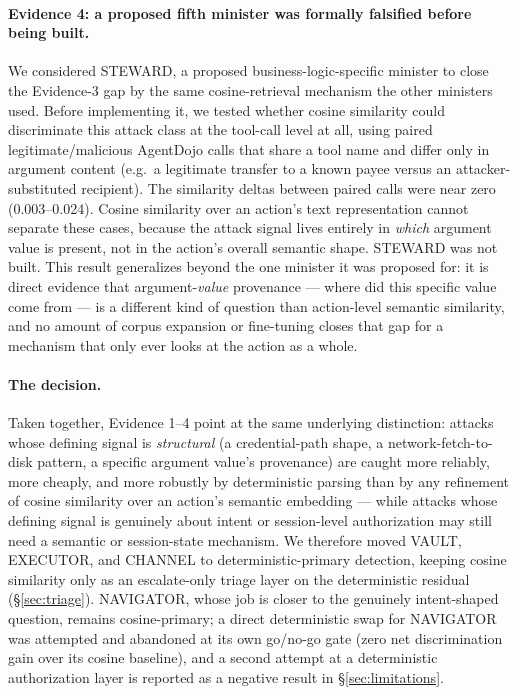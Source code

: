 \documentclass[sigconf,anonymous,review]{acmart}
\begin{document}
\paragraph{Evidence 4: a proposed fifth minister was formally falsified before
being built.} We considered STEWARD, a proposed business-logic-specific
minister to close the Evidence-3 gap by the same cosine-retrieval mechanism
the other ministers used. Before implementing it, we tested whether cosine
similarity could discriminate this attack class at the tool-call level at
all, using paired legitimate/malicious AgentDojo calls that share a tool name
and differ only in argument content (e.g.\ a legitimate transfer to a known
payee versus an attacker-substituted recipient). The similarity deltas
between paired calls were near zero (0.003--0.024). Cosine similarity over an
action's text representation cannot separate these cases, because the
attack signal lives entirely in \emph{which} argument value is present, not
in the action's overall semantic shape. STEWARD was not built. This result
generalizes beyond the one minister it was proposed for: it is direct
evidence that argument-\emph{value} provenance --- where did this specific
value come from --- is a different kind of question than action-level
semantic similarity, and no amount of corpus expansion or fine-tuning closes
that gap for a mechanism that only ever looks at the action as a whole.

\paragraph{The decision.} Taken together, Evidence 1--4 point at the same
underlying distinction: attacks whose defining signal is \emph{structural}
(a credential-path shape, a network-fetch-to-disk pattern, a specific
argument value's provenance) are caught more reliably, more cheaply, and more
robustly by deterministic parsing than by any refinement of cosine
similarity over an action's semantic embedding --- while attacks whose
defining signal is genuinely about intent or session-level authorization may
still need a semantic or session-state mechanism. We therefore moved VAULT,
EXECUTOR, and CHANNEL to deterministic-primary detection, keeping cosine
similarity only as an escalate-only triage layer on the deterministic
residual (\S\ref{sec:triage}). NAVIGATOR, whose job is closer to the
genuinely intent-shaped question, remains cosine-primary; a direct
deterministic swap for NAVIGATOR was attempted and abandoned at its own
go/no-go gate (zero net discrimination gain over its cosine baseline), and a
second attempt at a deterministic authorization layer is reported as a
negative result in \S\ref{sec:limitations}.
\end{document}
